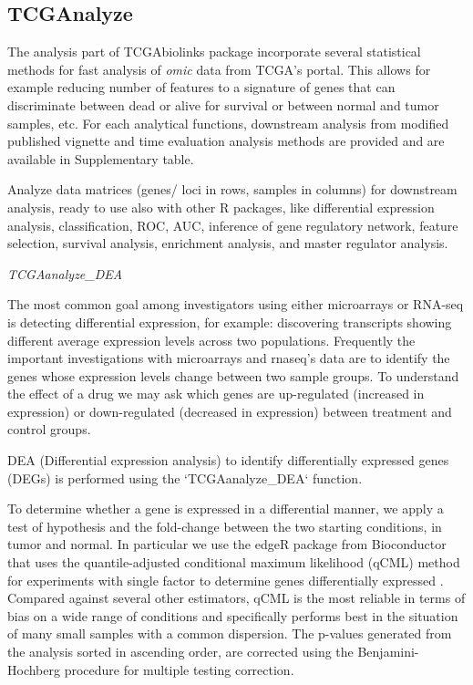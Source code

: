 \subsection{TCGAnalyze}



The analysis part of TCGAbiolinks package incorporate several statistical methods 
for fast analysis of \textit{omic} data from TCGA's portal.
This allows for example reducing number of features to a signature of genes that can discriminate between dead or alive for survival or between normal and tumor samples, etc.
For each analytical functions, downstream analysis from modified published vignette and time evaluation analysis methods are provided and are available in Supplementary table.

Analyze data matrices (genes/ loci in rows, samples in columns) for downstream analysis, ready to use also with other R packages, like differential expression analysis, classification, ROC, AUC, inference of gene regulatory network, feature selection, survival analysis, enrichment analysis, and master regulator analysis.

\textit{TCGAanalyze\_DEA}

The most common goal among investigators using either microarrays or RNA-seq is detecting differential expression, for example: discovering transcripts showing different average expression levels across two populations.
Frequently the important investigations with microarrays and rnaseq's data are to identify the genes whose expression levels change between two sample groups. To understand the effect of a drug we may ask which genes are up-regulated (increased in expression) or down-regulated (decreased in expression) between treatment and
control groups.

DEA (Differential expression analysis) to identify differentially expressed genes (DEGs) is performed using the `TCGAanalyze\_DEA` function. 

To determine whether a gene is expressed in a differential manner, we apply a test of hypothesis and the fold-change between the two starting conditions, in tumor and normal. In particular we use the edgeR package from Bioconductor that uses the quantile-adjusted conditional maximum likelihood (qCML) method for experiments with single factor to determine genes differentially expressed \cite{Robinson2010}. Compared against several other estimators, qCML is the most reliable in terms of bias on a wide range of conditions and specifically performs best in the situation of many small samples with a common dispersion. The p-values generated from the analysis sorted in ascending order, are corrected using the Benjamini-Hochberg procedure for multiple testing correction.

